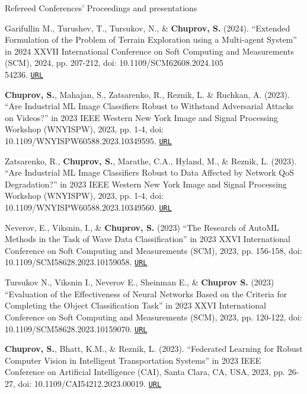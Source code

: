 \begin{rSection}{Refereed Conferences' Proceedings and presentations}
\begin{enumerate}[label=[C{{\arabic*}]}]
\item Garifullin M., Turushev, T., Tursukov, N., \& \textbf{Chuprov, S.} (2024). ``Extended Formulation of the Problem of Terrain Exploration using a Multi-agent System'' in 2024 XXVII International Conference on Soft Computing and Measurements (SCM), 2024, pp. 207-212, doi: 10.1109/SCM62608.2024.105\\54236. \href{https://ieeexplore-ieee-org.ezproxy.rit.edu/document/10554236}{\nolinkurl{URL}} 

\item \textbf{Chuprov, S.}, Mahajan, S., Zatsarenko, R., Reznik, L. \& Ruchkan, A. (2023). ``Are Industrial ML Image Classifiers Robust to Withstand Adversarial Attacks on Videos?'' in 2023 IEEE Western New York Image and Signal Processing Workshop (WNYISPW), 2023, pp. 1-4, doi: 10.1109/WNYISPW60588.2023.10349595. \href{https://ieeexplore.ieee.org/document/10349595}{\nolinkurl{URL}}

\item Zatsarenko, R., \textbf{Chuprov, S.}, Marathe, C.A., Hyland, M., \& Reznik, L. (2023). ``Are Industrial ML Image Classifiers Robust to Data Affected by Network QoS Degradation?'' in 2023 IEEE Western New York Image and Signal Processing Workshop (WNYISPW), 2023, pp. 1-4, doi: 10.1109/WNYISPW60588.2023.10349560. \href{https://ieeexplore.ieee.org/document/10349560}{\nolinkurl{URL}} 

\item Neverov, E., Viksnin, I., \& \textbf{Chuprov, S.} (2023) ``The Research of AutoML Methods in the Task of Wave Data Classification'' in 2023 XXVI International Conference on Soft Computing and Measurements (SCM), 2023, pp. 156-158, doi: 10.1109/SCM58628.2023.10159058.
\href{https://ieeexplore.ieee.org/abstract/document/10159058}{\nolinkurl{URL}}

\item Tursukov N., Viksnin I., Neverov E., Sheinman E., \& \textbf{Chuprov S.} (2023) ``Evaluation of the Effectiveness of Neural Networks Based on the Criteria for Completing the Object Classification Task'' in 2023 XXVI International Conference on Soft Computing and Measurements (SCM), 2023, pp. 120-122, doi: 10.1109/SCM58628.2023.10159070.
\href{https://ieeexplore.ieee.org/abstract/document/10159070}{\nolinkurl{URL}}

\item \textbf{Chuprov, S.}, Bhatt, K.M., \& Reznik, L. (2023). ``Federated Learning for Robust Computer Vision in Intelligent Transportation Systems'' in 2023 IEEE Conference on Artificial Intelligence (CAI), Santa Clara, CA, USA, 2023, pp. 26-27, doi: 10.1109/CAI54212.2023.00019.
\href{https://ieeexplore.ieee.org/document/10195053}{\nolinkurl{URL}}


\end{enumerate}
\end{rSection}
